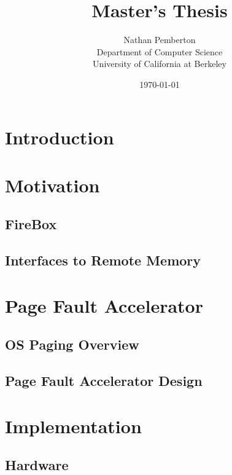 \documentclass[12pt]{article}
\title{Master's Thesis}
\author{
        Nathan Pemberton \\
                Department of Computer Science \\
                University of California at Berkeley
}
\date{\today}
\begin{document}
\maketitle

\newpage



\newpage
\tableofcontents
\newpage

\section{Introduction} \label{sec_intro}
    

\section{Motivation}
    \subsection{FireBox} \label{sec_firebox}
        
    \subsection{Interfaces to Remote Memory} \label{sec_rmemApproaches}
        
        
\section{Page Fault Accelerator} \label{sec_pfa}
    \subsection{OS Paging Overview} \label{sec_pagingOverview}
        
    \subsection{Page Fault Accelerator Design} \label{sec_pfaDesign}
        

        
\section{Implementation} \label{sec_impl}
    \subsection{Hardware} \label{sec_hwImpl}
        
\end{document}
